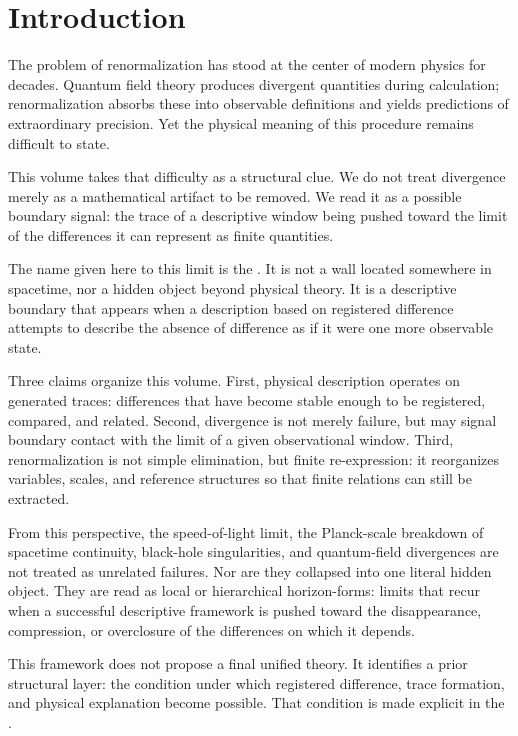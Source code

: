 \section{Introduction}

\label{sec:introduction}

The problem of renormalization has stood at the center of modern physics
for decades.
Quantum field theory produces divergent quantities during calculation;
renormalization absorbs these into observable definitions
and yields predictions of extraordinary precision.
Yet the physical meaning of this procedure remains difficult to state.

This volume takes that difficulty as a structural clue.
We do not treat divergence merely as a mathematical artifact to be removed.
We read it as a possible boundary signal:
the trace of a descriptive window being pushed toward the limit
of the differences it can represent as finite quantities.

The name given here to this limit is the \DH{}.
It is not a wall located somewhere in spacetime,
nor a hidden object beyond physical theory.
It is a descriptive boundary that appears when a description based on
registered difference attempts to describe the absence of difference
as if it were one more observable state.

Three claims organize this volume.
First,
physical description operates on generated traces:
differences that have become stable enough to be registered,
compared,
and related.
Second,
divergence is not merely failure,
but may signal boundary contact with the limit of a given observational
window.
Third,
renormalization is not simple elimination,
but finite re-expression:
it reorganizes variables,
scales,
and reference structures so that finite relations can still be extracted.

From this perspective,
the speed-of-light limit,
the Planck-scale breakdown of spacetime continuity,
black-hole singularities,
and quantum-field divergences are not treated as unrelated failures.
Nor are they collapsed into one literal hidden object.
They are read as local or hierarchical horizon-forms:
limits that recur when a successful descriptive framework is pushed toward
the disappearance,
compression,
or overclosure of the differences on which it depends.

This framework does not propose a final unified theory.
It identifies a prior structural layer:
the condition under which registered difference,
trace formation,
and physical explanation become possible.
That condition is made explicit in the \DHP{}.

